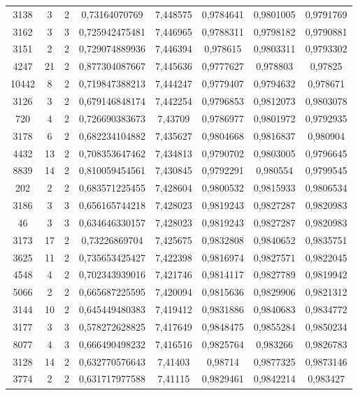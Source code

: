 \begin{longtable}{|c|c|c|c|c|c|c|c|}
3138 & 3 & 2 & 0,73164070769 & 7,448575 & 0,9784641 & 0,9801005 & 0,9791769 \\
3162 & 3 & 3 & 0,725942475481 & 7,446965 & 0,9788311 & 0,9798182 & 0,9790881 \\
3151 & 2 & 2 & 0,729074889936 & 7,446394 & 0,978615 & 0,9803311 & 0,9793302 \\
4247 & 21 & 2 & 0,877304087667 & 7,445636 & 0,9777627 & 0,978803 & 0,97825 \\
10442 & 8 & 2 & 0,719847388213 & 7,444247 & 0,9779407 & 0,9794632 & 0,978671 \\
3126 & 3 & 2 & 0,679146848174 & 7,442254 & 0,9796853 & 0,9812073 & 0,9803078 \\
720 & 4 & 2 & 0,726690383673 & 7,43709 & 0,9786977 & 0,9801972 & 0,9792935 \\
3178 & 6 & 2 & 0,682234104882 & 7,435627 & 0,9804668 & 0,9816837 & 0,980904 \\
4432 & 13 & 2 & 0,708353647462 & 7,434813 & 0,9790702 & 0,9803005 & 0,9796645 \\
8839 & 14 & 2 & 0,810059454561 & 7,430845 & 0,9792291 & 0,980554 & 0,9799545 \\
202 & 2 & 2 & 0,683571225455 & 7,428604 & 0,9800532 & 0,9815933 & 0,9806534 \\
3186 & 3 & 3 & 0,656165744218 & 7,428023 & 0,9819243 & 0,9827287 & 0,9820983 \\
46 & 3 & 3 & 0,634646330157 & 7,428023 & 0,9819243 & 0,9827287 & 0,9820983 \\
3173 & 17 & 2 & 0,73226869704 & 7,425675 & 0,9832808 & 0,9840652 & 0,9835751 \\
3625 & 11 & 2 & 0,735653425427 & 7,422398 & 0,9816974 & 0,9827571 & 0,9822045 \\
4548 & 4 & 2 & 0,702343939016 & 7,421746 & 0,9814117 & 0,9827789 & 0,9819942 \\
5066 & 2 & 2 & 0,665687225595 & 7,420094 & 0,9815636 & 0,9829906 & 0,9821312 \\
3144 & 10 & 2 & 0,645449480383 & 7,419412 & 0,9831886 & 0,9840683 & 0,9834772 \\
3177 & 3 & 3 & 0,578272628825 & 7,417649 & 0,9848475 & 0,9855284 & 0,9850234 \\
8077 & 4 & 3 & 0,666490498232 & 7,416516 & 0,9825764 & 0,983266 & 0,9826783 \\
3128 & 14 & 2 & 0,632770576643 & 7,41403 & 0,98714 & 0,9877325 & 0,9873146 \\
3774 & 2 & 2 & 0,631717977588 & 7,41115 & 0,9829461 & 0,9842214 & 0,983427 \\

\end{longtable}
